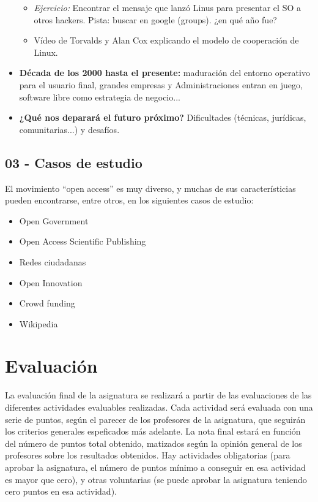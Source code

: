 \documentclass[a4paper,12pt]{article}
\begin{document}
\begin{itemize}
	\begin{itemize}
	\item \textit{Ejercicio:} Encontrar el mensaje que lanzó Linus para presentar el SO a otros hackers. Pista: buscar en google (groups). ¿en qué año fue?
	\item Vídeo de Torvalds y Alan Cox explicando el modelo de cooperación de Linux. 
	\end{itemize}
\item \textbf{Década de los 2000 hasta el presente:} maduración del entorno operativo para el usuario final, grandes empresas y Administraciones entran en juego, software libre como estrategia de negocio...
\item \textbf{¿Qué nos deparará el futuro próximo?} Dificultades (técnicas, jurídicas, comunitarias...) y desafíos.
\end{itemize}


\subsection{03 - Casos de estudio}

El movimiento ``open access'' es muy diverso, y muchas de sus característicias pueden encontrarse, entre otros, en los siguientes casos de estudio:

\begin{itemize}
\item Open Government
\item Open Access Scientific Publishing
\item Redes ciudadanas
\item Open Innovation
\item Crowd funding
\item Wikipedia
\end{itemize}

\section{Evaluación}

La evaluación final de la asignatura se realizará a partir de las evaluaciones de las diferentes actividades evaluables realizadas. Cada actividad será evaluada con una serie de puntos, según el parecer de los profesores de la asignatura, que seguirán los criterios generales espeficados más adelante. La nota final estará en función del número de puntos total obtenido, matizados según la opinión general de los profesores sobre los resultados obtenidos. Hay actividades obligatorias (para aprobar la asignatura, el número de puntos mínimo a conseguir en esa actividad es mayor que cero), y otras voluntarias (se puede aprobar la asignatura teniendo cero puntos en esa actividad).
\end{document}

